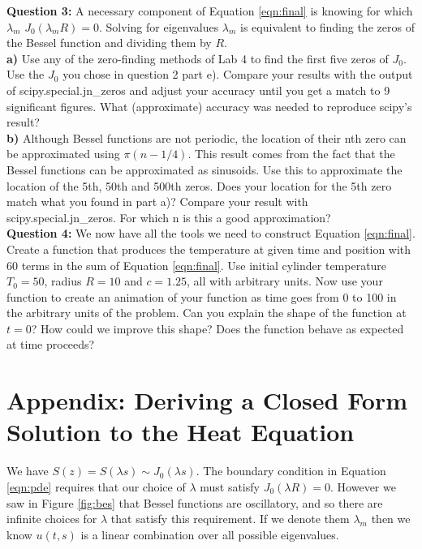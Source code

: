 \documentclass[a4paper,12pt]{article}
\begin{document}
\textbf{Question 3:} A necessary component of Equation \ref{eqn:final} is knowing for which $\lambda_m$ $J_0(\lambda_m R) = 0$. Solving for eigenvalues $\lambda_m$ is equivalent to finding the zeros of the Bessel function and dividing them by $R$.\\
\textbf{a)} Use any of the zero-finding methods of Lab 4 to find the first five zeros of $J_0$. Use the $J_0$ you chose in question 2 part e). Compare your results with the output of scipy.special.jn\_zeros and adjust your accuracy until you get a match to 9 significant figures. What (approximate) accuracy was needed to reproduce scipy's result?\\
\textbf{b)} Although Bessel functions are not periodic, the location of their nth zero can be approximated using $\pi\left(n-1/4\right)$. This result comes from the fact that the Bessel functions can be approximated as sinusoids. Use this to approximate the location of the 5th, 50th and 500th zeros. Does your location for the 5th zero match what you found in part a)? Compare your result with scipy.special.jn\_zeros. For which n is this a good approximation?  \\

\textbf{Question 4:} We now have all the tools we need to construct Equation \ref{eqn:final}. Create a function that produces the temperature at given time and position with 60 terms in the sum of Equation \ref{eqn:final}. Use initial cylinder temperature $T_0 = 50$, radius $R = 10$ and $c = 1.25$, all with arbitrary units. Now use your function to create an animation of your function as time goes from 0 to 100 in the arbitrary units of the problem. Can you explain the shape of the function at $t = 0$? How could we improve this shape? Does the function behave as expected at time proceeds?

\section*{Appendix: Deriving a Closed Form Solution to the Heat Equation}
\label{app:deriv}

We have $S(z) = S(\lambda s) \sim J_0(\lambda s)$. The boundary condition in Equation \ref{eqn:pde} requires that our choice of $\lambda$ must satisfy $J_0(\lambda R) = 0$. However we saw in Figure \ref{fig:bes} that Bessel functions are oscillatory, and so there are infinite choices for $\lambda$ that satisfy this requirement. If we denote them $\lambda_m$ then we know $u(t,s)$ is a linear combination over all possible eigenvalues.
\end{document}
